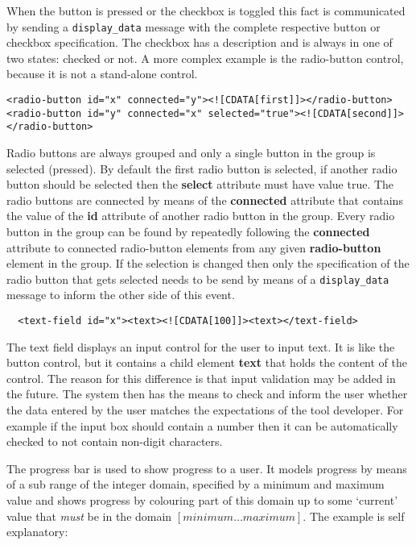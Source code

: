 \documentclass{article}
\newcommand{\msg}[1]{\texttt{#1}}
\begin{document}
   \noindent When the button is pressed or the checkbox is toggled this fact is
   communicated by sending a \msg{display\_data} message with the complete
   respective button or checkbox specification. The checkbox has a description
   and is always in one of two states: checked or not. A more complex example
   is the radio-button control, because it is not a stand-alone control.

    \begin{verbatim}
<radio-button id="x" connected="y"><![CDATA[first]]></radio-button>
<radio-button id="y" connected="x" selected="true"><![CDATA[second]]></radio-button>\end{verbatim}

   \noindent Radio buttons are always grouped and only a single button in the group is
   selected (pressed).  By default the first radio button is selected, if
   another radio button should be selected then the \textbf{select} attribute
   must have value true. The radio buttons are connected by means of the
   \textbf{connected} attribute that contains the value of the \textbf{id}
   attribute of another radio button in the group. Every radio button in the
   group can be found by repeatedly following the \textbf{connected} attribute
   to connected radio-button elements from any given \textbf{radio-button}
   element in the group. If the selection is changed then only the
   specification of the radio button that gets selected needs to be send by
   means of a \msg{display\_data} message to inform the other side of this
   event.

    \begin{verbatim}
  <text-field id="x"><text><![CDATA[100]]><text></text-field>\end{verbatim}

   \noindent The text field displays an input control for the user to input text. It is
   like the button control, but it contains a child element \textbf{text} that
   holds the content of the control. The reason for this difference is that
   input validation may be added in the future. The system then has the means
   to check and inform the user whether the data entered by the user matches
   the expectations of the tool developer. For example if the input box should
   contain a number then it can be automatically checked to not contain
   non-digit characters.

   The progress bar is used to show progress to a user. It models progress by
   means of a sub range of the integer domain, specified by a minimum and
   maximum value and shows progress by colouring part of this domain up to some
   `current' value that \emph{must} be in the domain $[ minimum \ldots
   maximum ]$. The example is self explanatory:
\end{document}
